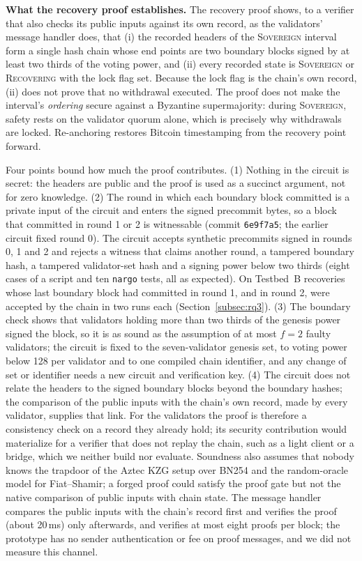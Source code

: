 \textbf{What the recovery proof establishes.} The recovery proof shows, to a verifier that
also checks its public inputs against its own record, as the validators' message
handler does, that (i) the recorded headers of the \textsc{Sovereign} interval
form a single hash chain whose end points are two boundary blocks signed by at
least two thirds of the voting power, and (ii) every recorded state is
\textsc{Sovereign} or \textsc{Recovering} with the lock flag set. Because the
lock flag is the chain's own record, (ii) does not prove that no withdrawal
executed. The proof does not make the interval's \emph{ordering} secure
against a Byzantine supermajority: during \textsc{Sovereign}, safety rests on
the validator quorum alone, which is precisely why withdrawals are locked.
Re-anchoring restores Bitcoin timestamping from the recovery point forward.

Four points bound how much the proof contributes. (1) Nothing in the circuit is secret: the headers are public and the proof is used as a succinct argument, not for zero knowledge. (2) The round in which each boundary block committed is a private input of the circuit and enters the signed precommit bytes, so a block that committed in round 1 or 2 is witnessable (commit \texttt{6e9f7a5}; the earlier circuit fixed round 0). The circuit accepts synthetic precommits signed in rounds 0, 1 and 2 and rejects a witness that claims another round, a tampered boundary hash, a tampered validator-set hash and a signing power below two thirds (eight cases of a script and ten \texttt{nargo} tests, all as expected). On Testbed~B recoveries whose last boundary block had committed in round 1, and in round 2, were accepted by the chain in two runs each (Section~\ref{subsec:rq3}). (3) The boundary check shows that validators holding more than two thirds of the genesis power signed the block, so it is as sound as the assumption of at most $f{=}2$ faulty validators; the circuit is fixed to the seven-validator genesis set, to voting power below 128 per validator and to one compiled chain identifier, and any change of set or identifier needs a new circuit and verification key. (4) The circuit does not relate the headers to the signed boundary blocks beyond the boundary hashes; the comparison of the public inputs with the chain's own record, made by every validator, supplies that link. For the validators the proof is therefore a consistency check on a record they already hold; its security contribution would materialize for a verifier that does not replay the chain, such as a light client or a bridge, which we neither build nor evaluate. Soundness also assumes that nobody knows the trapdoor of the Aztec KZG setup over BN254 and the random-oracle model for Fiat--Shamir; a forged proof could satisfy the proof gate but not the native comparison of public inputs with chain state. The message handler compares the public inputs with the chain's record first and verifies the proof (about 20\,ms) only afterwards, and verifies at most eight proofs per block; the prototype has no sender authentication or fee on proof messages, and we did not measure this channel.

